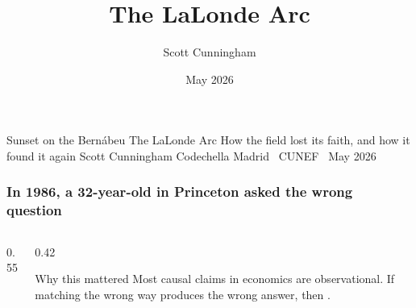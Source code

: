 \documentclass[10pt,aspectratio=169]{beamer}
\title{The LaLonde Arc}
\author{Scott Cunningham}
\date{May 2026}
\begin{document}

\rmtitleframe%
  {Sunset on the Bern\'abeu}%
  {The LaLonde Arc}%
  {How the field lost its faith, and how it found it again}%
  {Scott Cunningham}%
  {Codechella Madrid \textperiodcentered\ CUNEF \textperiodcentered\ May 2026}

\begin{frame}
  \frametitle{In 1986, a 32-year-old in Princeton asked the wrong question}
  \vspace{0.5cm}
  \begin{columns}[T,onlytextwidth]
    \begin{column}{0.55\textwidth}
      \vspace{0.8em}

    \end{column}
    \begin{column}{0.42\textwidth}
      \begin{block}{Why this mattered}
        Most causal claims in economics are observational. If matching the wrong way
        produces the wrong answer, then .
      \end{block}
    \end{column}
  \end{columns}
\end{frame}
\end{document}
